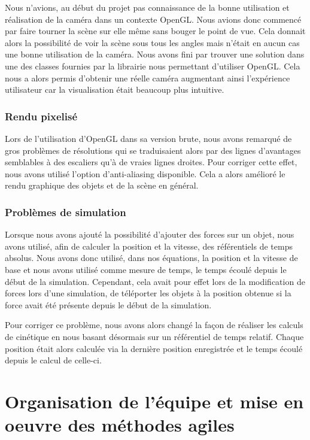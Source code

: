 \documentclass[11pt]{report}
\begin{document}
Nous n'avions, au début du projet pas connaissance de la bonne utilisation et réalisation de la caméra dans un contexte OpenGL. Nous avions
donc commencé par faire tourner la scène sur elle même sans bouger le point de vue. Cela donnait alors la possibilité de voir la scène sous tous les angles mais n'était en aucun cas une bonne utilisation de la caméra. Nous avons fini par trouver une solution dans une des classes fournies par la librairie nous permettant d'utiliser OpenGL. Cela nous a alors permis d'obtenir une réelle caméra augmentant ainsi l'expérience utilisateur car la visualisation était beaucoup plus intuitive.

\newpage

\subsection{Rendu pixelisé}


Lors de l'utilisation d'OpenGL dans sa version brute, nous avons remarqué de gros problèmes de résolutions qui se traduisaient alors
par des lignes d'avantages semblables à des escaliers qu'à de vraies lignes droites. Pour corriger cette effet, nous avons utilisé l'option
d'anti-aliasing disponible. Cela a alors amélioré le rendu graphique des objets et de la scène en général.

\subsection{Problèmes de simulation}

Lorsque nous avons ajouté la possibilité d'ajouter des forces sur un objet, nous avons utilisé, afin de calculer la position et la vitesse, des
référentiels de temps absolus. Nous avons donc utilisé, dans nos équations, la position et la vitesse de base et nous avons utilisé comme mesure
de temps, le temps écoulé depuis le début de la simulation. Cependant, cela avait pour effet lors de la modification de forces lors d'une
simulation, de téléporter les objets à la position obtenue si la force avait été présente depuis le début de la simulation.

Pour corriger ce problème, nous avons alors changé la façon de réaliser les calculs de cinétique en nous basant désormais sur un référentiel de temps relatif. Chaque position était alors calculée via la dernière position enregistrée et le temps écoulé depuis le calcul de celle-ci.

\chapter{Organisation de l'équipe et mise en oeuvre des méthodes agiles}
\end{document}

